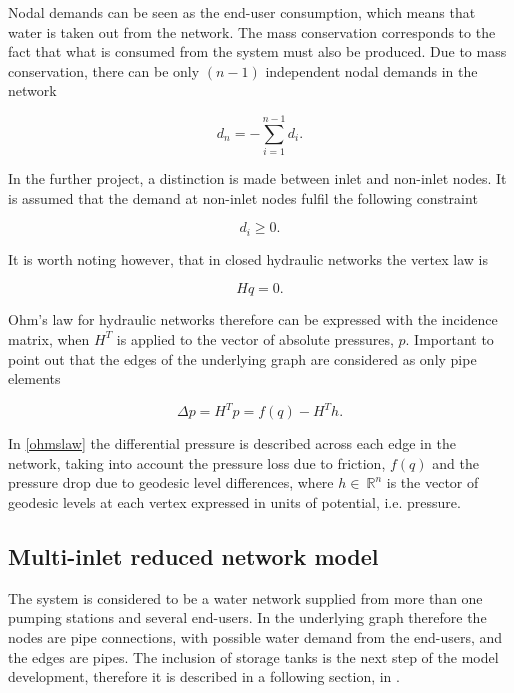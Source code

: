 Nodal demands can be seen as the end-user consumption, which means that water is taken out from the network. The mass conservation corresponds to the fact that what is consumed from the system must also be produced. Due to mass conservation, there can be only $(n-1)$ independent nodal demands in the network

\begin{equation}
  \label{mass_conservation}
  d_n = - \sum_{i=1}^{n-1} d_i.
\end{equation}

In the further project, a distinction is made between inlet and non-inlet nodes. It is assumed that the demand at non-inlet nodes fulfil the following constraint

\begin{equation}
  \label{non_inlet_constraint}
  d_i \geq 0.
\end{equation}

It is worth noting however, that in closed hydraulic networks the vertex law is

\begin{equation}
  \label{vertexlaw_closed}
  Hq = 0.
\end{equation}

Ohm's law for hydraulic networks therefore can be expressed with the incidence matrix, when $H^T$ is applied to the vector of absolute pressures, $p$. Important to point out that the edges of the underlying graph are considered as only pipe elements

\begin{equation}
  \label{ohmslaw}
  \Delta p = H^Tp = f(q) - H^Th.
\end{equation}

In \eqref{ohmslaw} the differential pressure is described across each edge in the network, taking into account the pressure loss due to friction, $f(q)$ and the pressure drop due to geodesic level differences,  where $h \in \: \mathbb{R}^{n}$ is the vector of geodesic levels at each vertex expressed in units of potential, i.e. pressure. 






\subsection{Multi-inlet reduced network model}
\label{multi_inlet_reduced_network_description}

The system is considered to be a water network supplied from more than one pumping stations and several end-users. In the underlying graph therefore the nodes are pipe connections, with possible water demand from the end-users, and the edges are pipes. The inclusion of storage tanks is the next step of the model development, therefore it is described in a following section, in .

